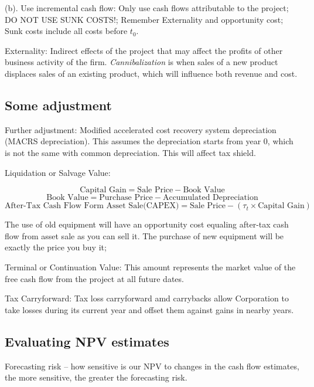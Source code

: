 \documentclass[10pt, a4paper]{article}
\begin{document}
    \quad(b). Use incremental cash flow: Only use cash flows attributable to the project; DO NOT USE SUNK COSTS!; Remember Externality and opportunity cost; Sunk costs include all costs before $t_0$. 

    Externality: Indirect effects of the project that may affect the profits of other business activity of the firm. \emph{Cannibalization} is when sales of a new product displaces sales of an existing product, which will influence both revenue and cost.
    

    \subsection{Some adjustment}

    Further  adjustment: Modified accelerated cost recovery system depreciation (MACRS depreciation). This assumes the depreciation starts from year 0, which is not the same with common depreciation. This will affect tax shield.
    \medskip
    
    Liquidation or Salvage Value:

    $$\text{Capital Gain} = \text{Sale Price} - \text{Book Value}$$
    $$\text{Book Value} = \text{Purchase Price} - \text{Accumulated Depreciation}$$
    $$\text{After-Tax Cash Flow Form Asset Sale(CAPEX)} = \text{Sale Price} - (\tau_t \times \text{Capital Gain})$$

    The use of old equipment will have an opportunity cost equaling after-tax cash flow from asset sale as you can sell it. The purchase of new equipment will be exactly the price you buy it; 

    \medskip

    Terminal or Continuation Value: This amount represents the market value of the free cash flow from the project at all future dates. 


    Tax Carryforward: Tax loss carryforward  amd carrybacks allow Corporation to take losses during its current year and offset them against gains in nearby years. 

    \subsection{Evaluating NPV estimates} 
        Forecasting risk -- how sensitive is our NPV to changes in the cash flow estimates, the more sensitive, the greater the forecasting risk. 
\end{document}
